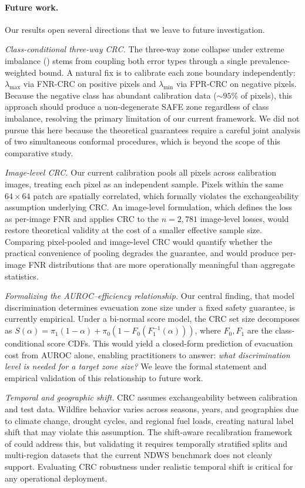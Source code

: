 \documentclass{article}
\begin{document}
\paragraph{Future work.}
Our results open several directions that we leave to future investigation.

\textit{Class-conditional three-way CRC.}
The three-way zone collapse under extreme imbalance () stems from coupling both error types through a single prevalence-weighted bound.
A natural fix is to calibrate each zone boundary independently: $\lambda_{\max}$ via FNR-CRC on positive pixels and $\lambda_{\min}$ via FPR-CRC on negative pixels.
Because the negative class has abundant calibration data (${\sim}95\%$ of pixels), this approach should produce a non-degenerate SAFE zone regardless of class imbalance, resolving the primary limitation of our current framework.
We did not pursue this here because the theoretical guarantees require a careful joint analysis of two simultaneous conformal procedures, which is beyond the scope of this comparative study.

\textit{Image-level CRC.}
Our current calibration pools all pixels across calibration images, treating each pixel as an independent sample.
Pixels within the same $64{\times}64$ patch are spatially correlated, which formally violates the exchangeability assumption underlying CRC.
An image-level formulation, which defines the loss as per-image FNR and applies CRC to the $n{=}2{,}781$ image-level losses, would restore theoretical validity at the cost of a smaller effective sample size.
Comparing pixel-pooled and image-level CRC would quantify whether the practical convenience of pooling degrades the guarantee, and would produce per-image FNR distributions that are more operationally meaningful than aggregate statistics.

\textit{Formalizing the AUROC--efficiency relationship.}
Our central finding, that model discrimination determines evacuation zone size under a fixed safety guarantee, is currently empirical.
Under a bi-normal score model, the CRC set size decomposes as $S(\alpha) = \pi_1(1{-}\alpha) + \pi_0(1 - F_0(F_1^{-1}(\alpha)))$, where $F_0, F_1$ are the class-conditional score CDFs.
This would yield a closed-form prediction of evacuation cost from AUROC alone, enabling practitioners to answer: \emph{what discrimination level is needed for a target zone size?}
We leave the formal statement and empirical validation of this relationship to future work.

\textit{Temporal and geographic shift.}
CRC assumes exchangeability between calibration and test data.
Wildfire behavior varies across seasons, years, and geographies due to climate change, drought cycles, and regional fuel loads, creating natural label shift that may violate this assumption.
The shift-aware recalibration framework of \citet{angelopoulos2022conformal} could address this, but validating it requires temporally stratified splits and multi-region datasets that the current NDWS benchmark does not cleanly support.
Evaluating CRC robustness under realistic temporal shift is critical for any operational deployment.
\end{document}
